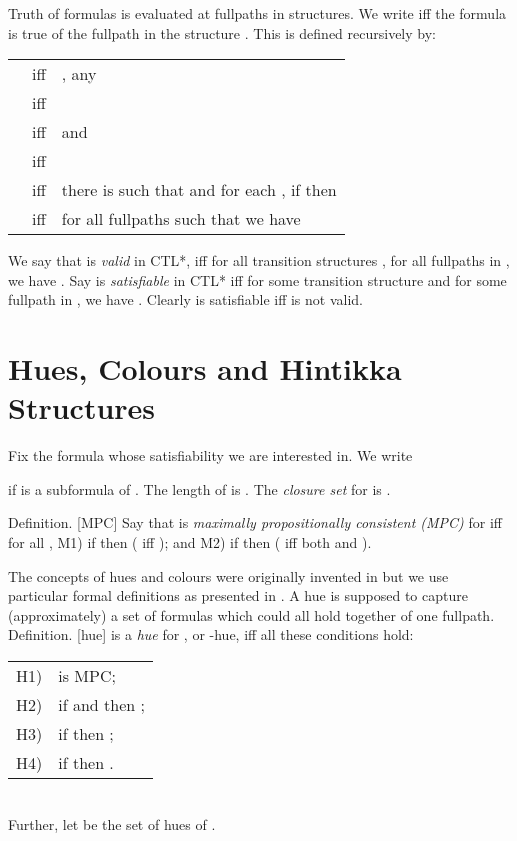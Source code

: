 \documentclass[submission,copyright,creativecommons]{eptcs}
\newenvironment{definition}{Definition. }{}
\begin{document}
Truth of formulas is evaluated at fullpaths
in structures.
We write  iff the
formula  is true of the fullpath 
in the structure .
This is defined recursively by:\\
\begin{tabular}{lll}
 & iff & , any \\
 & iff &
\\
 & iff &
 and 
\\
 & iff &
\\
 & iff &   
there is  such that
 and
for each , if  then
\\ 
 & iff &
for all fullpaths  such that
 we have
\\
\end{tabular}



We say that  is {\em valid} in CTL*, iff
for all transition structures , for all fullpaths  in ,
we have
.
Say  is {\em satisfiable} in CTL* iff
for some transition structure  and for some fullpath  in ,
we have
.
Clearly  is satisfiable
iff  is not valid.


\section{Hues, Colours and Hintikka Structures}
\label{sec:huecol}

Fix the formula  whose
satisfiability we are interested in.
We write

if  is a subformula
of .
The length of  is .
The {\em closure set} for  is .

\begin{definition}[MPC]
Say that 
is {\em maximally propositionally consistent (MPC)}
for 
iff
for all ,
M1) if  then
( iff ); and M2)
if  then
( iff
both  and ).
\end{definition}

The concepts of hues and colours
were originally invented in 
\cite{Rey:ctlstar}
but we use 
particular formal 
definitions as presented
in \cite{Rey:startabFM,Rey:startab,Rey:fasttablong}.
A hue is supposed
to 
capture (approximately) a set
of formulas
which could all hold
together of one fullpath.
\begin{definition}[hue]
 is a {\em hue} for ,
or -hue, iff
all these conditions hold:\\
\begin{tabular}{ll}
H1) &
 is MPC;\\
H2) & if 
and  then ;\\
H3) & if 
then ;\\
H4) &
if 
then .\\
\end{tabular}\\
Further, let  be the set of hues of .
\end{definition}
\end{document}
